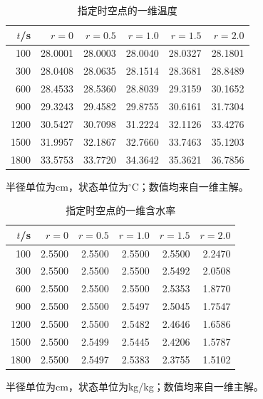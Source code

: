 \begin{table}[H]\centering\small
\caption{指定时空点的一维温度}\label{tab:temperature}
\begin{tabular}{rrrrrr}\toprule
$t$/s & $r=0$ & $r=0.5$ & $r=1.0$ & $r=1.5$ & $r=2.0$\\\midrule
100 & 28.0001 & 28.0003 & 28.0040 & 28.0327 & 28.1801\\
300 & 28.0408 & 28.0635 & 28.1514 & 28.3681 & 28.8489\\
600 & 28.4533 & 28.5360 & 28.8039 & 29.3159 & 30.1652\\
900 & 29.3243 & 29.4582 & 29.8755 & 30.6161 & 31.7304\\
1200 & 30.5427 & 30.7098 & 31.2224 & 32.1126 & 33.4276\\
1500 & 31.9957 & 32.1867 & 32.7660 & 33.7463 & 35.1203\\
1800 & 33.5753 & 33.7720 & 34.3642 & 35.3621 & 36.7856\\
\bottomrule\end{tabular}
\par{\footnotesize 半径单位为cm，状态单位为$^\circ$C；数值均来自一维主解。}
\end{table}
\begin{table}[H]\centering\small
\caption{指定时空点的一维含水率}\label{tab:moisture}
\begin{tabular}{rrrrrr}\toprule
$t$/s & $r=0$ & $r=0.5$ & $r=1.0$ & $r=1.5$ & $r=2.0$\\\midrule
100 & 2.5500 & 2.5500 & 2.5500 & 2.5500 & 2.2470\\
300 & 2.5500 & 2.5500 & 2.5500 & 2.5492 & 2.0508\\
600 & 2.5500 & 2.5500 & 2.5500 & 2.5353 & 1.8770\\
900 & 2.5500 & 2.5500 & 2.5497 & 2.5045 & 1.7547\\
1200 & 2.5500 & 2.5500 & 2.5482 & 2.4646 & 1.6586\\
1500 & 2.5500 & 2.5499 & 2.5445 & 2.4206 & 1.5787\\
1800 & 2.5500 & 2.5497 & 2.5383 & 2.3755 & 1.5102\\
\bottomrule\end{tabular}
\par{\footnotesize 半径单位为cm，状态单位为kg/kg；数值均来自一维主解。}
\end{table}